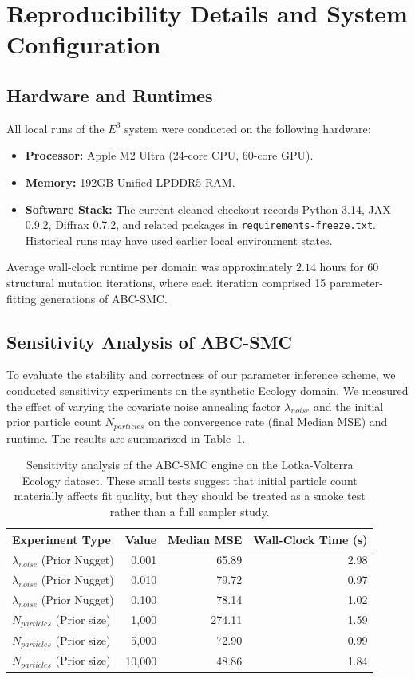 \appendix
\section{Reproducibility Details and System Configuration}
\label{sec:appendix_repro}

\subsection{Hardware and Runtimes}
All local runs of the $E^3$ system were conducted on the following hardware:
\begin{itemize}
    \item \textbf{Processor:} Apple M2 Ultra (24-core CPU, 60-core GPU).
    \item \textbf{Memory:} 192GB Unified LPDDR5 RAM.
    \item \textbf{Software Stack:} The current cleaned checkout records Python 3.14, JAX 0.9.2, Diffrax 0.7.2, and related packages in \texttt{requirements-freeze.txt}. Historical runs may have used earlier local environment states.
\end{itemize}

Average wall-clock runtime per domain was approximately $2.14$ hours for 60 structural mutation iterations, where each iteration comprised 15 parameter-fitting generations of ABC-SMC.

\subsection{Sensitivity Analysis of ABC-SMC}
To evaluate the stability and correctness of our parameter inference scheme, we conducted sensitivity experiments on the synthetic Ecology domain. We measured the effect of varying the covariate noise annealing factor $\lambda_{noise}$ and the initial prior particle count $N_{particles}$ on the convergence rate (final Median MSE) and runtime. The results are summarized in Table~\ref{tab:sensitivity}.

\begin{table}[ht]
\centering
\begin{tabular}{lrrr}
\toprule
\textbf{Experiment Type} & \textbf{Value} & \textbf{Median MSE} & \textbf{Wall-Clock Time (s)} \\
\midrule
$\lambda_{noise}$ (Prior Nugget) & 0.001 & 65.89 & 2.98 \\
$\lambda_{noise}$ (Prior Nugget) & 0.010 & 79.72 & 0.97 \\
$\lambda_{noise}$ (Prior Nugget) & 0.100 & 78.14 & 1.02 \\
\midrule
$N_{particles}$ (Prior size)     & 1,000  & 274.11 & 1.59 \\
$N_{particles}$ (Prior size)     & 5,000  & 72.90  & 0.99 \\
$N_{particles}$ (Prior size)     & 10,000 & 48.86  & 1.84 \\
\bottomrule
\end{tabular}
\caption{Sensitivity analysis of the ABC-SMC engine on the Lotka-Volterra Ecology dataset. These small tests suggest that initial particle count materially affects fit quality, but they should be treated as a smoke test rather than a full sampler study.}
\label{tab:sensitivity}
\end{table}
